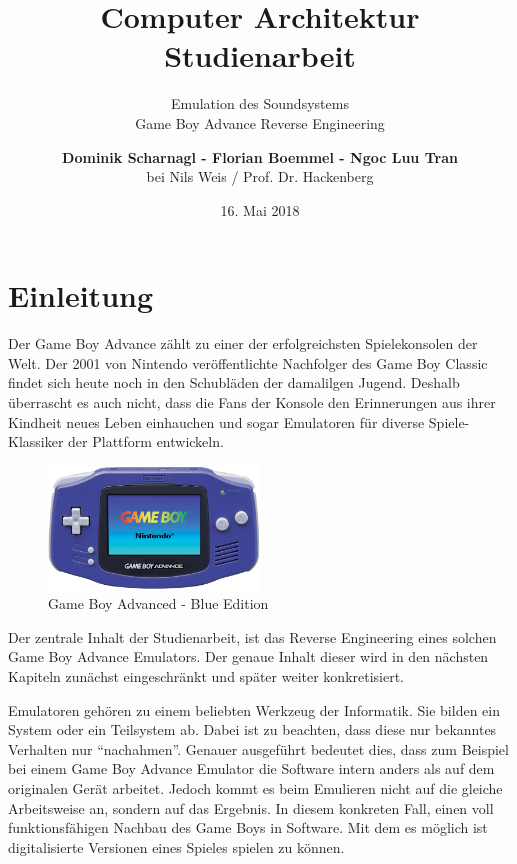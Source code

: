 \documentclass[11pt,a4paper]{scrartcl}
\title{\vspace{5cm}\huge Computer Architektur \\ \Large Studienarbeit \vspace{1cm}}
\subtitle{\Huge Emulation des Soundsystems \\ \Large Game Boy Advance Reverse Engineering \vspace{1cm}}
\author{\large \textbf{Dominik Scharnagl - Florian Boemmel - Ngoc Luu Tran}\\ \normalsize bei Nils Weis / Prof. Dr. Hackenberg}
\date{\normalsize 16. Mai 2018}
\begin{document}
\sffamily

\maketitle
\thispagestyle{empty}
\clearpage

\setcounter{page}{1}


\tableofcontents
\clearpage
{}


\printindex
\clearpage


\section{Einleitung}

Der Game Boy Advance z\"ahlt zu einer der erfolgreichsten Spielekonsolen der Welt. Der 2001 von Nintendo\cite{NintendoGeschichte} ver\"offentlichte Nachfolger des Game Boy Classic findet sich heute noch in den Schubl\"aden der damalilgen Jugend. Deshalb \"uberrascht es auch nicht, dass die Fans der Konsole den Erinnerungen aus ihrer Kindheit neues Leben einhauchen und sogar Emulatoren f\"ur diverse Spiele-Klassiker der Plattform entwickeln.

\begin{figure}[h]
    \centering
    \includegraphics[width=0.5\textwidth]{GameBoyAdvance}
    \caption{Game Boy Advanced - Blue Edition}
    \label{fig:gba}
\end{figure}

Der zentrale Inhalt der Studienarbeit, ist das Reverse Engineering eines solchen Game Boy Advance Emulators. Der genaue Inhalt dieser wird in den n\"achsten Kapiteln zun\"achst eingeschr\"ankt und sp\"ater weiter konkretisiert.

Emulatoren geh\"oren zu einem beliebten Werkzeug der Informatik. Sie bilden ein System oder ein Teilsystem ab. Dabei ist zu beachten, dass diese nur bekanntes Verhalten nur \enquote{nachahmen}. Genauer ausgef\"uhrt bedeutet dies, dass zum Beispiel bei einem Game Boy Advance Emulator die Software intern anders als auf dem originalen Ger\"at arbeitet. Jedoch kommt es beim Emulieren nicht auf die gleiche Arbeitsweise an, sondern auf das Ergebnis. In diesem konkreten Fall, einen voll funktionsf\"ahigen Nachbau des Game Boys in Software. Mit dem es m\"oglich ist digitalisierte Versionen eines Spieles spielen zu k\"onnen.\newline
\end{document}

